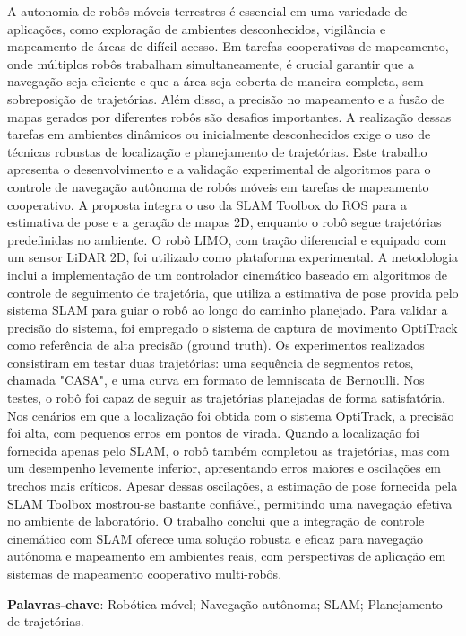\begin{resumo}
A autonomia de robôs móveis terrestres é essencial em uma variedade de aplicações, como exploração de ambientes desconhecidos, vigilância e mapeamento de áreas de difícil acesso. Em tarefas cooperativas de mapeamento, onde múltiplos robôs trabalham simultaneamente, é crucial garantir que a navegação seja eficiente e que a área seja coberta de maneira completa, sem sobreposição de trajetórias. Além disso, a precisão no mapeamento e a fusão de mapas gerados por diferentes robôs são desafios importantes. A realização dessas tarefas em ambientes dinâmicos ou inicialmente desconhecidos exige o uso de técnicas robustas de localização e planejamento de trajetórias. Este trabalho apresenta o desenvolvimento e a validação experimental de algoritmos para o controle de navegação autônoma de robôs móveis em tarefas de mapeamento cooperativo. A proposta integra o uso da SLAM Toolbox do ROS para a estimativa de pose e a geração de mapas 2D, enquanto o robô segue trajetórias predefinidas no ambiente. O robô LIMO, com tração diferencial e equipado com um sensor LiDAR 2D, foi utilizado como plataforma experimental. A metodologia inclui a implementação de um controlador cinemático baseado em algoritmos de controle de seguimento de trajetória, que utiliza a estimativa de pose provida pelo sistema SLAM para guiar o robô ao longo do caminho planejado. Para validar a precisão do sistema, foi empregado o sistema de captura de movimento OptiTrack como referência de alta precisão (ground truth). Os experimentos realizados consistiram em testar duas trajetórias: uma sequência de segmentos retos, chamada "CASA", e uma curva em formato de lemniscata de Bernoulli. Nos testes, o robô foi capaz de seguir as trajetórias planejadas de forma satisfatória. Nos cenários em que a localização foi obtida com o sistema OptiTrack, a precisão foi alta, com pequenos erros em pontos de virada. Quando a localização foi fornecida apenas pelo SLAM, o robô também completou as trajetórias, mas com um desempenho levemente inferior, apresentando erros maiores e oscilações em trechos mais críticos. Apesar dessas oscilações, a estimação de pose fornecida pela SLAM Toolbox mostrou-se bastante confiável, permitindo uma navegação efetiva no ambiente de laboratório. O trabalho conclui que a integração de controle cinemático com SLAM oferece uma solução robusta e eficaz para navegação autônoma e mapeamento em ambientes reais, com perspectivas de aplicação em sistemas de mapeamento cooperativo multi-robôs.

\textbf{Palavras-chave}: Robótica móvel; Navegação autônoma; SLAM; Planejamento de trajetórias.
\end{resumo}


